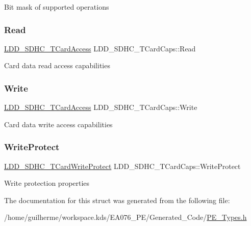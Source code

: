 Bit mask of supported operations \mbox{\label{struct_l_d_d___s_d_h_c___t_card_caps_ae5a39842e7b8c28f9246d3fc1b9a8f54}} 
\subsubsection{\texorpdfstring{Read}{Read}}
{\footnotesize\ttfamily \hyperlink{struct_l_d_d___s_d_h_c___t_card_access}{L\+D\+D\+\_\+\+S\+D\+H\+C\+\_\+\+T\+Card\+Access} L\+D\+D\+\_\+\+S\+D\+H\+C\+\_\+\+T\+Card\+Caps\+::\+Read}

Card data read access capabilities \mbox{\label{struct_l_d_d___s_d_h_c___t_card_caps_ad28c378a6b9edfbd726a8019d5c8be79}} 
\subsubsection{\texorpdfstring{Write}{Write}}
{\footnotesize\ttfamily \hyperlink{struct_l_d_d___s_d_h_c___t_card_access}{L\+D\+D\+\_\+\+S\+D\+H\+C\+\_\+\+T\+Card\+Access} L\+D\+D\+\_\+\+S\+D\+H\+C\+\_\+\+T\+Card\+Caps\+::\+Write}

Card data write access capabilities \mbox{\label{struct_l_d_d___s_d_h_c___t_card_caps_a32ecbbace3b435b1d70a57b09bf9662b}} 
\subsubsection{\texorpdfstring{Write\+Protect}{WriteProtect}}
{\footnotesize\ttfamily \hyperlink{struct_l_d_d___s_d_h_c___t_card_write_protect}{L\+D\+D\+\_\+\+S\+D\+H\+C\+\_\+\+T\+Card\+Write\+Protect} L\+D\+D\+\_\+\+S\+D\+H\+C\+\_\+\+T\+Card\+Caps\+::\+Write\+Protect}

Write protection properties 

The documentation for this struct was generated from the following file\+:\begin{DoxyCompactItemize}
\item 
/home/guilherme/workspace.\+kds/\+E\+A076\+\_\+\+P\+E/\+Generated\+\_\+\+Code/\hyperlink{_p_e___types_8h}{P\+E\+\_\+\+Types.\+h}\end{DoxyCompactItemize}
